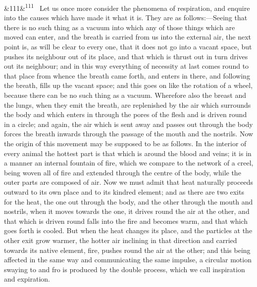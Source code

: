 \documentclass[12pt]{article}
\newcommand{\para}[1][]{\par\noindent\ifx&#1&\else\textsuperscript{\footnotesize #1}~\fi}
\begin{document}
\para[111] Let us once more consider the phenomena of respiration, and enquire into the causes which have made it what it is. They are as follows:---Seeing that there is no such thing as a vacuum into which any of those things which are moved can enter, and the breath is carried from us into the external air, the next point is, as will be clear to every one, that it does not go into a vacant space, but pushes its neighbour out of its place, and that which is thrust out in turn drives out its neighbour; and in this way everything of necessity at last comes round to that place from whence the breath came forth, and enters in there, and following the breath, fills up the vacant space; and this goes on like the rotation of a wheel, because there can be no such thing as a vacuum. Wherefore also the breast and the lungs, when they emit the breath, are replenished by the air which surrounds the body and which enters in through the pores of the flesh and is driven round in a circle; and again, the air which is sent away and passes out through the body forces the breath inwards through the passage of the mouth and the nostrils. Now the origin of this movement may be supposed to be as follows. In the interior of every animal the hottest part is that which is around the blood and veins; it is in a manner an internal fountain of fire, which we compare to the network of a creel, being woven all of fire and extended through the centre of the body, while the outer parts are composed of air. Now we must admit that heat naturally proceeds outward to its own place and to its kindred element; and as there are two exits for the heat, the one out through the body, and the other through the mouth and nostrils, when it moves towards the one, it drives round the air at the other, and that which is driven round falls into the fire and becomes warm, and that which goes forth is cooled. But when the heat changes its place, and the particles at the other exit grow warmer, the hotter air inclining in that direction and carried towards its native element, fire, pushes round the air at the other; and this being affected in the same way and communicating the same impulse, a circular motion swaying to and fro is produced by the double process, which we call inspiration and expiration.
\end{document}
